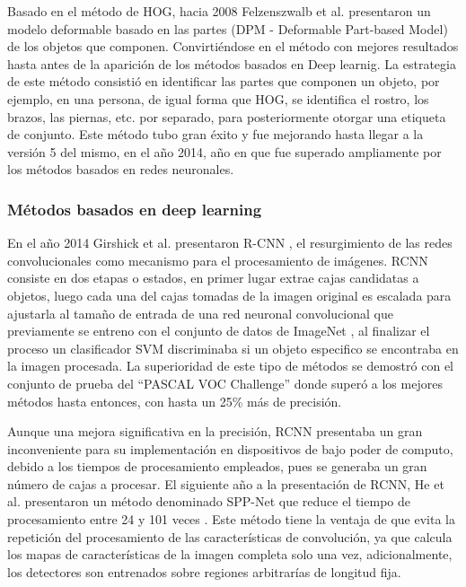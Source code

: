             Basado en el método de HOG, hacia 2008 Felzenszwalb et al. presentaron un modelo deformable basado en las partes (DPM - Deformable Part-based Model) de los objetos que componen. Convirtiéndose en el método con mejores resultados hasta antes de la aparición de los métodos basados en Deep learnig. La estrategia de este método consistió en identificar las partes que componen un objeto, por ejemplo, en una persona, de igual forma que HOG, se identifica el rostro, los brazos, las piernas, etc. por separado, para posteriormente otorgar una etiqueta de conjunto. Este método tubo gran éxito y fue mejorando hasta llegar a la versión 5 del mismo, en el año 2014, año en que fue superado ampliamente por los métodos basados en redes neuronales.
            
        \subsubsection{Métodos basados en deep learning}
        \label{Sub2:FrameObjectDetectionNN}
            En el año 2014 Girshick et al. presentaron R-CNN \cite{Girshick2014}, el resurgimiento de las redes convolucionales como mecanismo para el procesamiento de imágenes. RCNN consiste en dos etapas o estados, en primer lugar extrae cajas candidatas a objetos, luego cada una del cajas tomadas de la imagen original es escalada para ajustarla al tamaño de entrada de una red neuronal convolucional que previamente se entreno con el conjunto de datos de ImageNet \cite{ImageNet2009}, al finalizar el proceso un clasificador SVM discriminaba si un objeto especifico se encontraba en la imagen procesada. La superioridad de este tipo de métodos se demostró con el conjunto de prueba del ``PASCAL VOC Challenge'' \cite{VOC2010} donde superó a los mejores métodos hasta entonces, con hasta un 25\% más de precisión.
            
            Aunque una mejora significativa en la precisión, RCNN presentaba un gran inconveniente para su implementación en dispositivos de bajo poder de computo, debido a los tiempos de procesamiento empleados, pues se generaba un gran número de cajas a procesar. El siguiente año a la presentación de RCNN, He et al. presentaron un método denominado SPP-Net que reduce el tiempo de procesamiento entre 24 y 101 veces \cite{He2015}. Este método tiene la ventaja de que evita la repetición del procesamiento de las características de convolución, ya que calcula los mapas de características de la imagen completa solo una vez, adicionalmente, los detectores son entrenados sobre regiones arbitrarías de longitud fija.
            
